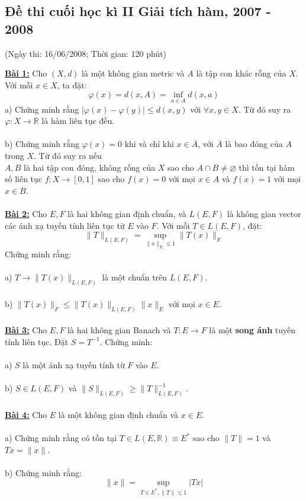 \documentclass[10pt, a4paper]{article}
\begin{document}
\newpage

\subsection{Đề thi cuối học kì II Giải tích hàm, 2007 - 2008}
\begin{center}
	\color{blue}(Ngày thi: 16/06/2008; Thời gian: 120 phút)
\end{center}
\color{red}\underline{\textbf{Bài 1:}} \color{black}Cho $(X,d)$ là một không gian metric và $A$ là tập con khác rỗng của $X$. Với mỗi $x\in X$, ta đặt: $$\varphi(x)=d(x,A)=\displaystyle\inf_{a\in A}d(x,a)$$
\color{red}a) \color{black}Chứng minh rằng $|\varphi(x)-\varphi(y)|\le d(x,y)$ với $\forall x,y\in X$. Từ đó suy ra $\varphi:X\rightarrow\mathbb R$ là hàm liên tục đều.\\\\
\color{red}b) \color{black}Chứng minh rằng $\varphi(x)=0$ khi và chỉ khi $x\in\overline A$, với $\overline A$ là bao đóng của $A$ trong $X$. Từ đó suy ra nếu\\ $A,B$ là hai tập con đóng, không rỗng của $X$ sao cho $A\cap B\ne\varnothing$ thì tồn tại hàm số liên tục $f:X\rightarrow[0,1]$ sao cho $f(x)=0$ với mọi $x\in A$ và $f(x)=1$ với mọi $x\in B$.\\\\
\color{red}\underline{\textbf{Bài 2:}} \color{black}Cho $E,F$ là hai không gian định chuẩn, và $L(E,F)$ là không gian vector các ánh xạ tuyến tính liên tục từ $E$ vào $F$. Với mỗi $T\in L(E,F)$, đặt: $$\lVert T\rVert_{L(E,F)}=\displaystyle\sup_{\lVert x\rVert_E\le1}\lVert T(x)\rVert_F$$ Chứng minh rằng:\\\\
\color{red}a) \color{black}$T\rightarrow\lVert T(x)\rVert_{L(E,F)}$ là một chuẩn trên $L(E,F)$.\\\\
\color{red}b) \color{black}$\lVert T(x)\rVert_F\le\lVert T(x)\rVert_{L(E,F)}\lVert x\rVert_E$ với mọi $x\in E$.\\\\
\color{red}\underline{\textbf{Bài 3:}} \color{black}Cho $E,F$ là hai không gian Banach và $T:E\rightarrow F$ là một \textbf{song ánh} tuyến tính liên tục. Đặt $S=T^{-1}$. Chứng minh:\\\\
\color{red}a) \color{black}$S$ là một ánh xạ tuyến tính từ $F$ vào $E$.\\\\
\color{red}b) \color{black}$S\in L(E,F)$ và $\lVert S\rVert_{L(E,F)}\ge\lVert T\rVert_{L(E,F)}^{-1}$.\\\\
\color{red}\underline{\textbf{Bài 4:}} \color{black}Cho $E$ là một không gian định chuẩn và $x\in E$.\\\\
\color{red}a) \color{black}Chứng minh rằng có tồn tại $T\in L(E,\mathbb R)\equiv E^*$ sao cho $\lVert T\rVert=1$ và $Tx=\lVert x\rVert$.\\\\
\color{red}b) \color{black}Chứng minh rằng: $$\lVert x\rVert=\displaystyle\sup_{T\in E^*,\lVert T\rVert\le1}|Tx|$$
\end{document}
